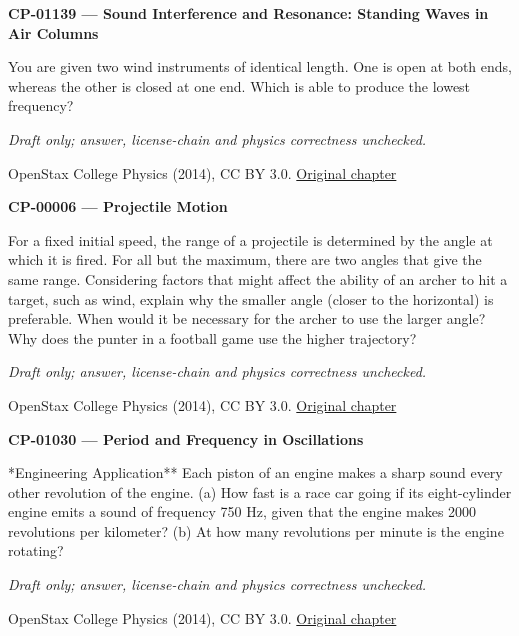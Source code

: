 \par\medskip
\noindent\textbf{CP-01139 — Sound Interference and Resonance: Standing Waves in Air Columns}
\par You are given two wind instruments of identical length. One is open at both ends, whereas the other is closed at one end. Which is able to produce the lowest frequency?
\par\smallskip
\textit{Draft only; answer, license-chain and physics correctness unchecked.}
\par{\footnotesize OpenStax College Physics (2014), CC BY 3.0. \href{https://github.com/philschatz/physics-book/blob/a7efaa7e221fab1694022d8bb98b83a73ee31d3d/contents/m42296.md}{Original chapter}}\par\normalsize

\par\medskip
\noindent\textbf{CP-00006 — Projectile Motion}
\par For a fixed initial speed, the range of a projectile is determined by the angle at which it is fired. For all but the maximum, there are two angles that give the same range. Considering factors that might affect the ability of an archer to hit a target, such as wind, explain why the smaller angle (closer to the horizontal) is preferable. When would it be necessary for the archer to use the larger angle? Why does the punter in a football game use the higher trajectory?
\par\smallskip
\textit{Draft only; answer, license-chain and physics correctness unchecked.}
\par{\footnotesize OpenStax College Physics (2014), CC BY 3.0. \href{https://github.com/philschatz/physics-book/blob/a7efaa7e221fab1694022d8bb98b83a73ee31d3d/contents/m42042.md}{Original chapter}}\par\normalsize

\par\medskip
\noindent\textbf{CP-01030 — Period and Frequency in Oscillations}
\par **Engineering Application** Each piston of an engine makes a sharp sound every other revolution of the engine. (a) How fast is a race car going if its eight-cylinder engine emits a sound of frequency 750 Hz, given that the engine makes 2000 revolutions per kilometer? (b) At how many revolutions per minute is the engine rotating?
\par\smallskip
\textit{Draft only; answer, license-chain and physics correctness unchecked.}
\par{\footnotesize OpenStax College Physics (2014), CC BY 3.0. \href{https://github.com/philschatz/physics-book/blob/a7efaa7e221fab1694022d8bb98b83a73ee31d3d/contents/m42241.md}{Original chapter}}\par\normalsize


